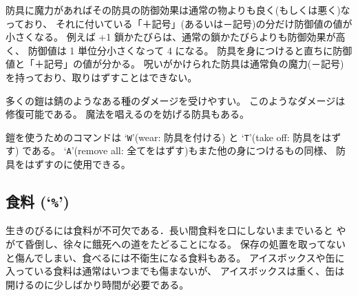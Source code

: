 防具に魔力があればその防具の防御効果は通常の物よりも良く(もしくは悪く)なっており、
それに付いている「＋記号」(あるいは－記号)の分だけ防御値の値が小さくなる。
例えば +1 鎖かたびらは、通常の鎖かたびらよりも防御効果が高く、
防御値は 1 単位分小さくなって 4 になる。
防具を身につけると直ちに防御値と「＋記号」の値が分かる。
呪いがかけられた防具は通常負の魔力(－記号)を持っており、取りはずすことはできない。

多くの鎧は錆のようなある種のダメージを受けやすい。
このようなダメージは修復可能である。
魔法を唱えるのを妨げる防具もある。

鎧を使うためのコマンドは `{\tt W}'(wear: 防具を付ける) と
`{\tt T}'(take off: 防具をはずす) である。
`{\tt A}'(remove all: 全てをはずす)もまた他の身につけるもの同様、
防具をはずすのに使用できる。

\subsection*{食料 (`{\tt \%}')}

生きのびるには食料が不可欠である．長い間食料を口にしないままでいると
やがて昏倒し、徐々に餓死への道をたどることになる。
保存の処置を取ってないと傷んでしまい、食べるには不衛生になる食料もある。
アイスボックスや缶に入っている食料は通常はいつまでも傷まないが、
アイスボックスは重く、缶は開けるのに少しばかり時間が必要である。

